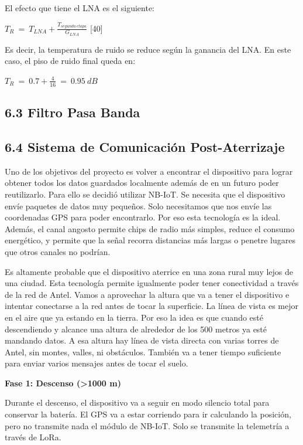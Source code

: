 \documentclass[12pt,a4paper]{article}
\begin{document}
El efecto que tiene el LNA es el siguiente:

\(T_{R}\  = \ T_{LNA} + \frac{T_{segunda\ etapa}}{G_{LNA}}\) {[}40{]}

Es decir, la temperatura de ruido se reduce según la ganancia del LNA. En este caso, el piso de ruido final queda en:

\(T_{R}\  = \ 0.7 + \frac{4}{16}\  = \ 0.95\ dB\)

\subsection{6.3 Filtro Pasa Banda}\label{filtro-pasa-banda}

\subsection{\texorpdfstring{6.4 \textbf{Sistema de Comunicación Post-Aterrizaje}}{6.4 Sistema de Comunicación Post-Aterrizaje}}\label{sistema-de-comunicaciuxf3n-post-aterrizaje}

Uno de los objetivos del proyecto es volver a encontrar el dispositivo para lograr obtener todos los datos guardados localmente además de en un futuro poder reutilizarlo. Para ello se decidió utilizar NB-IoT. Se necesita que el dispositivo envíe paquetes de datos muy pequeños. Solo necesitamos que nos envíe las coordenadas GPS para poder encontrarlo. Por eso esta tecnología es la ideal. Además, el canal angosto permite chips de radio más simples, reduce el consumo energético, y permite que la señal recorra distancias más largas o penetre lugares que otros canales no podrían.

Es altamente probable que el dispositivo aterrice en una zona rural muy lejos de una ciudad. Esta tecnología permite igualmente poder tener conectividad a través de la red de Antel. Vamos a aprovechar la altura que va a tener el dispositivo e intentar conectarse a la red antes de tocar la superficie. La línea de vista es mejor en el aire que ya estando en la tierra. Por eso la idea es que cuando esté descendiendo y alcance una altura de alrededor de los 500 metros ya esté mandando datos. A esa altura hay línea de vista directa con varias torres de Antel, sin montes, valles, ni obstáculos. También va a tener tiempo suficiente para enviar varios mensajes antes de tocar el suelo.

\textbf{Fase 1: Descenso (\textgreater1000 m)}

Durante el descenso, el dispositivo va a seguir en modo silencio total para conservar la batería. El GPS va a estar corriendo para ir calculando la posición, pero no transmite nada el módulo de NB-IoT. Solo se transmite la telemetría a través de LoRa.
\end{document}
